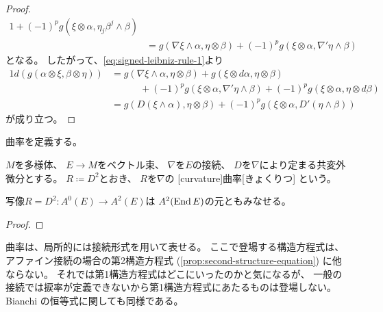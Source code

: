 \documentclass[report]{jlreq}
\begin{document}
\begin{proof}
\begin{alignat}{1}
            + (-1)^p g(\xi \otimes \alpha, \eta_j \beta^j \wedge \beta) \\
        &= g(\nabla \xi \wedge \alpha, \eta \otimes \beta)
            + (-1)^p g(\xi \otimes \alpha, \nabla' \eta \wedge \beta)
    \end{alignat}
    となる。
    したがって、\cref{eq:signed-leibniz-rule-1}より
    \begin{alignat}{1}
        d(g(\alpha \otimes \xi, \beta \otimes \eta))
            &= g(\nabla \xi \wedge \alpha, \eta \otimes \beta)
                + g(\xi \otimes d\alpha, \eta \otimes \beta) \\
            &\qquad \quad + (-1)^p g(\xi \otimes \alpha, \nabla' \eta \wedge \beta)
                + (-1)^p g(\xi \otimes \alpha, \eta \otimes d\beta) \\
            &= g(D(\xi \wedge \alpha), \eta \otimes \beta)
                + (-1)^p g(\xi \otimes \alpha, D'(\eta \wedge \beta))
    \end{alignat}
    が成り立つ。
\end{proof}

曲率を定義する。

\begin{definition}[曲率]
    $M$を多様体、
    $E \to M$をベクトル束、
    $\nabla$を$E$の接続、
    $D$を$\nabla$により定まる共変外微分とする。
    $R \coloneqq D^2$とおき、
    $R$を$\nabla$の
    [curvature]{曲率}[きょくりつ]
    という。
\end{definition}

\begin{proposition}
    写像$R = D^2 \colon A^0(E) \to A^2(E)$は
    $A^2(\operatorname{End} E)$の元ともみなせる。
\end{proposition}

\begin{proof}
    \TODO{}
\end{proof}

曲率は、局所的には接続形式を用いて表せる。
ここで登場する構造方程式は、アファイン接続の場合の第2構造方程式
(\cref{prop:second-structure-equation})
に他ならない。
それでは第1構造方程式はどこにいったのかと気になるが、
一般の接続では捩率が定義できないから第1構造方程式にあたるものは登場しない。
Bianchi の恒等式に関しても同様である。

\end{document}
